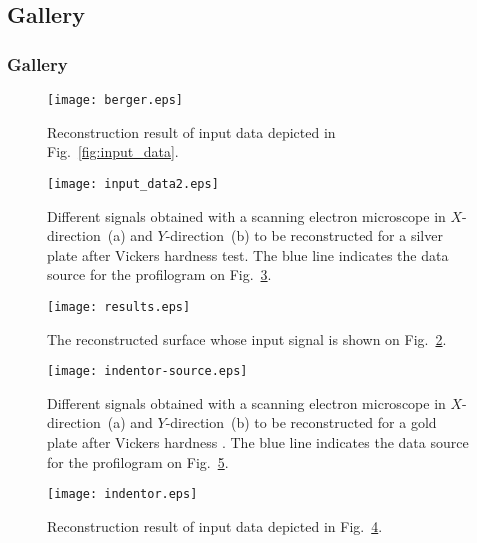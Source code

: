 \documentclass{beamer}
\begin{document}
\subsection{Gallery}
\begin{frame}[c,allowframebreaks]
    \frametitle{Gallery}

    \begin{figure}
        \texttt{[image: berger.eps]}
        \caption{Reconstruction result of input data depicted in Fig.~\ref{fig:input_data}.}
        {\label{fig:berger}}%
    \end{figure}

\framebreak

    \begin{figure}
        \texttt{[image: input\_data2.eps]}
        \caption{Different signals obtained with a scanning electron microscope in $X$-direction~(a)
        and $Y$-direction~(b) to be reconstructed for a silver plate after Vickers hardness test.
        The blue line indicates the data source for the profilogram on Fig.~\ref{fig:results}.}
    {\label{fig:input_data2}}%
    \end{figure}

\framebreak
    \begin{figure}[t]
        \texttt{[image: results.eps]}
        \caption{The reconstructed surface whose input signal is shown on  Fig.~\ref{fig:input_data2}.}
        {\label{fig:results}}
    \end{figure}

\framebreak

    \begin{figure}
        \texttt{[image: indentor-source.eps]}
        \caption{Different signals obtained with a scanning electron microscope in $X$-direction~(a) and $Y$-direction~(b) to be reconstructed for a gold plate after Vickers hardness . The blue line indicates the data source for the profilogram on Fig.~\ref{fig:indentor}.}
        {\label{fig:indentor-source}}%
    \end{figure}

\framebreak

    \begin{figure}
        \texttt{[image: indentor.eps]}
        \caption{Reconstruction result of input data depicted in Fig.~\ref{fig:indentor-source}.}
        {\label{fig:indentor}}%
    \end{figure}

\end{frame}
\end{document}
